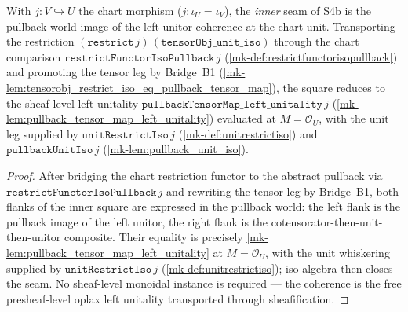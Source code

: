 \begin{lemma}\label{mk-lem:tensorobj_unit_iso_restrict_compat_inner}
  \leanok

  With \(j : V \hookrightarrow U\) the chart morphism (\(j \mathbin{;} \iota_U = \iota_V\)), the
  \emph{inner} seam of S4b is the pullback-world image of the left-unitor coherence at the chart unit.
  Transporting the restriction \((\mathtt{restrict}\,j)\,(\mathtt{tensorObj\_unit\_iso})\) through the
  chart comparison \(\mathtt{restrictFunctorIsoPullback}\,j\) (\ref{mk-def:restrictfunctorisopullback})
  and promoting the tensor leg by Bridge~B1
  (\ref{mk-lem:tensorobj_restrict_iso_eq_pullback_tensor_map}), the square reduces to the sheaf-level
  left unitality \(\mathtt{pullbackTensorMap\_left\_unitality}\,j\)
  (\ref{mk-lem:pullback_tensor_map_left_unitality}) evaluated at \(M = \mathcal{O}_U\), with the unit leg
  supplied by \(\mathtt{unitRestrictIso}\,j\) (\ref{mk-def:unitrestrictiso}) and
  \(\mathtt{pullbackUnitIso}\,j\) (\ref{mk-lem:pullback_unit_iso}).
\end{lemma}
\begin{proof}
  \leanok
  After bridging the chart restriction functor to the abstract pullback via
  \(\mathtt{restrictFunctorIsoPullback}\,j\) and rewriting the tensor leg by Bridge~B1, both flanks of
  the inner square are expressed in the pullback world: the left flank is the pullback image of the
  left unitor, the right flank is the cotensorator-then-unit-then-unitor composite. Their equality is
  precisely \ref{mk-lem:pullback_tensor_map_left_unitality} at \(M = \mathcal{O}_U\), with the unit
  whiskering supplied by \(\mathtt{unitRestrictIso}\,j\) (\ref{mk-def:unitrestrictiso}); iso-algebra then
  closes the seam. No sheaf-level monoidal instance is required --- the coherence is the free
  presheaf-level oplax left unitality transported through sheafification.
\end{proof}

